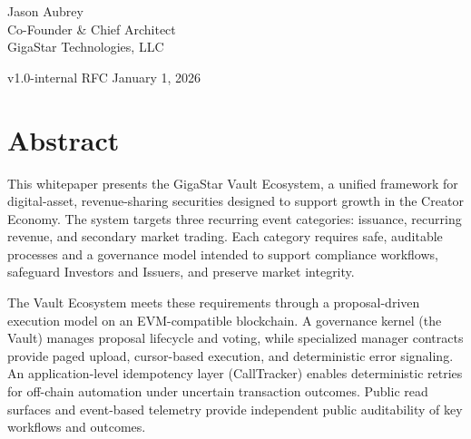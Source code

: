 \documentclass[10pt]{article}
\newif\ifGigaTitlePage
\begin{document}
\begin{titlepage}
\begin{center}
        \vspace{11.0cm}

        {\large
            Jason Aubrey \\
            Co-Founder \& Chief Architect \\
            GigaStar Technologies, LLC
        }

        \vspace{0.5cm}

        {\large v1.0-internal RFC}\break
        {\large January 1, 2026}

        \vspace{0.5cm}

    \end{center}

    \vfill

    \noindent\colorbox{GigaIris}{\parbox{\dimexpr\textwidth\relax}{\rule{0pt}{1.0cm}}}

    \restoregeometry
\end{titlepage}
\GigaTitlePagefalse %

\tableofcontents
\newpage
{}

\setlength{\footskip}{12pt}


\section{Abstract}
This whitepaper presents the GigaStar Vault Ecosystem, a unified framework for digital-asset,
revenue-sharing securities designed to support growth in the Creator Economy. The system targets three
recurring event categories: issuance, recurring revenue, and secondary market trading. Each category
requires safe, auditable processes and a governance model intended to support compliance workflows,
safeguard Investors and Issuers, and preserve market integrity.

The Vault Ecosystem meets these requirements through a proposal-driven execution model on an
EVM-compatible blockchain. A governance kernel (the Vault) manages proposal lifecycle and voting, while
specialized manager contracts provide paged upload, cursor-based execution, and deterministic error
signaling. An application-level idempotency layer (CallTracker) enables deterministic retries for off-chain
automation under uncertain transaction outcomes. Public read surfaces and event-based telemetry
provide independent public auditability of key workflows and outcomes.
\end{document}

